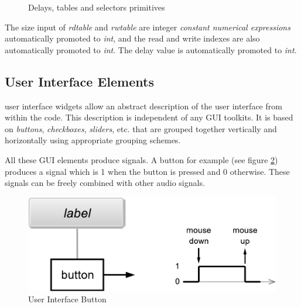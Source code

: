 \begin{figure}
\caption{Delays, tables and selectors primitives }
\label{fig-delays}
\end{figure}

The size input of \textit{rdtable} and \textit{rwtable} are integer \textit{constant numerical expressions} automatically promoted to \textit{int}, and the read and write indexes are also automatically promoted to \textit{int}. The delay value is automatically promoted to \textit{int}.

\subsection{User Interface Elements}

\faust user interface widgets allow an abstract description of the user interface from within the \faust code. This description is
independent of any GUI toolkits. It is based on \emph{buttons}, \emph{checkboxes}, \emph{sliders}, etc. that are grouped together 
vertically and horizontally using appropriate grouping schemes.

All these GUI elements produce signals. A button for example (see figure \ref{fig-button}) produces a signal which is 1 when the button is pressed and 0 otherwise. These signals can be freely combined with other audio signals. 

\begin{figure}[h]
\centering
\includegraphics[scale=0.5]{illustrations/button}
\caption{User Interface Button}
\label{fig-button}
\end{figure}

\bigskip

